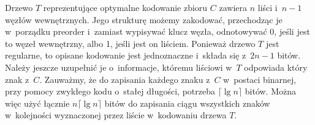 \exercise %
Drzewo $T$ reprezentujące optymalne kodowanie zbioru $C$ zawiera $n$ liści i~$n-1$ węzłów wewnętrznych.
Jego strukturę możemy zakodować, przechodząc je w~porządku preorder i~zamiast wypisywać klucz węzła, odnotowywać 0, jeśli jest to węzeł wewnętrzny, albo 1, jeśli jest on liściem.
Ponieważ drzewo $T$ jest regularne, to opisane kodowanie jest jednoznaczne i~składa się z~$2n-1$ bitów.
Należy jeszcze uzupełnić je o~informacje, któremu liściowi w~$T$ odpowiada który znak z~$C$.
Zauważmy, że do zapisania każdego znaku z~$C$ w~postaci binarnej, przy pomocy zwykłego kodu o~stałej długości, potrzeba $\lceil\lg n\rceil$ bitów.
Można więc użyć łącznie $n\lceil\lg n\rceil$ bitów do zapisania ciągu wszystkich znaków w~kolejności wyznaczonej przez liście w~kodowaniu drzewa $T$.

\exercise %
\exercise %
\exercise %
